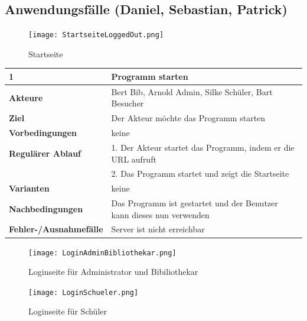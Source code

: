 \documentclass[fontsize=12pt,paper=a4,twoside]{scrartcl}
\begin{document}
\subsection{Anwendungsfälle (Daniel, Sebastian, Patrick)} 
\begin{figure}
	[H] \caption{Startseite} 
	\texttt{[image: StartseiteLoggedOut.png]} \label{pic:Startseite} 
\end{figure}
\begin{table}
	[H] \label{1} 
	\begin{tabular}
		{|l|p{10cm}|} \hline \textbf{1} & \textbf{Programm starten} \\
		\hline \textbf{Akteure} & Bert Bib, Arnold Admin, Silke Schüler, Bart Besucher\\
		\hline \textbf{Ziel} & Der Akteur möchte das Programm starten \\
		\hline \textbf{Vorbedingungen} & keine \\
		\hline \textbf{Regulärer Ablauf} & 1. Der Akteur startet das Programm, indem er die URL aufruft \\
		&2. Das Programm startet und zeigt die Startseite \\
		\hline \textbf{Varianten} & keine \\
		\hline \textbf{Nachbedingungen} & Das Programm ist gestartet und der Benutzer kann dieses nun verwenden\\
		\hline \textbf{Fehler-/Ausnahmefälle} & Server ist nicht erreichbar \\
		\hline 
	\end{tabular}
\end{table}
\begin{figure}
	[H] \caption{Loginseite für Administrator und Bibiliothekar} 
	\texttt{[image: LoginAdminBibliothekar.png]} \label{pic:LoginAdminBib} 
\end{figure}
\begin{figure}
	[H] \caption{Loginseite für Schüler} 
	\texttt{[image: LoginSchueler.png]} \label{pic:LoginSchueler} 
\end{figure}
\end{document}
